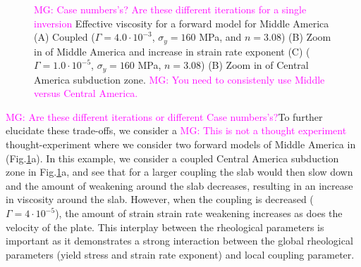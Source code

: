 \documentclass[12pt]{article}
\newcommand{\mgnote}[1]{\textcolor{magenta}{MG: #1}}
\begin{document}
{\begin{figure}[H]
\hspace{0.2cm}
\caption{\mgnote{Case numbers's? Are these different iterations for a single inversion} Effective viscosity for a forward model for Middle America (A) Coupled ($\Gamma = 4.0 \cdot 10^{-3}$, $\sigma_y = 160$ MPa, and $n = 3.08$) (B) Zoom in of Middle America and increase in strain rate exponent (C) ($\Gamma = 1.0 \cdot 10^{-5}$, $\sigma_y = 160$ MPa, $n = 3.08$)
(B) Zoom in of Central America subduction zone. \mgnote{You need to consistenly use Middle versus Central America.}}
\label{fig:middle_physics}
\end{figure}

\mgnote{Are these different iterations or different Case numbers's?}To further elucidate these trade-offs, we consider a \mgnote{This is not a thought experiment } thought-experiment where we consider two forward models of Middle America in (Fig.\ref{fig:middle_physics}a). In this example, we consider a coupled Central America subduction zone in Fig.\ref{fig:middle_physics}a, and see  that for a larger coupling the slab would then slow down and the amount of weakening around the slab decreases, resulting in an increase in viscosity around the slab. However, when the coupling is decreased ($\Gamma=4\cdot 10^{-5}$), the amount of strain strain rate weakening increases as does the velocity of the plate. This interplay between the rheological parameters is important as it demonstrates a strong interaction between the global rheological parameters (yield stress and strain rate exponent) and local coupling parameter.



}
\end{document}
